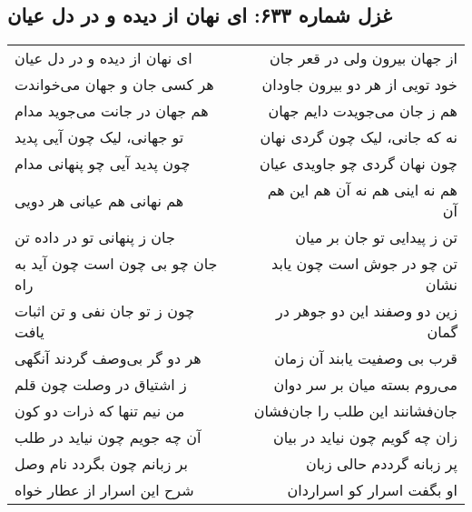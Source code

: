 \begin{center}
\section*{غزل شماره ۶۳۳: ای نهان از دیده و در دل عیان}
\label{sec:633}
\begin{longtable}{l p{0.5cm} r}
ای نهان از دیده و در دل عیان
&&
از جهان بیرون ولی در قعر جان
\\
هر کسی جان و جهان می‌خواندت
&&
خود تویی از هر دو بیرون جاودان
\\
هم جهان در جانت می‌جوید مدام
&&
هم ز جان می‌جویدت دایم جهان
\\
تو جهانی، لیک چون آیی پدید
&&
نه که جانی، لیک چون گردی نهان
\\
چون پدید آیی چو پنهانی مدام
&&
چون نهان گردی چو جاویدی عیان
\\
هم نهانی هم عیانی هر دویی
&&
هم نه اینی هم نه آن هم این هم آن
\\
جان ز پنهانی تو در داده تن
&&
تن ز پیدایی تو جان بر میان
\\
جان چو بی چون است چون آید به راه
&&
تن چو در جوش است چون یابد نشان
\\
چون ز تو جان نفی و تن اثبات یافت
&&
زین دو وصفند این دو جوهر در گمان
\\
هر دو گر بی‌وصف گردند آنگهی
&&
قرب بی وصفیت یابند آن زمان
\\
ز اشتیاق در وصلت چون قلم
&&
می‌روم بسته میان بر سر دوان
\\
من نیم تنها که ذرات دو کون
&&
جان‌فشانند این طلب را جان‌فشان
\\
آن چه جویم چون نیاید در طلب
&&
زان چه گویم چون نیاید در بیان
\\
بر زبانم چون بگردد نام وصل
&&
پر زبانه گرددم حالی زبان
\\
شرح این اسرار از عطار خواه
&&
او بگفت اسرار کو اسراردان
\\
\end{longtable}
\end{center}
